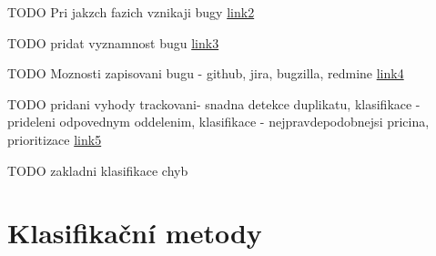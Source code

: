 \documentclass[czech,DP]{thesiskiv}
\begin{document}
 





TODO Pri jakzch fazich vznikaji bugy \href{https://en.wikipedia.org/wiki/Project_management}{link2} 

TODO  pridat vyznamnost bugu \href{https://www.getzephyr.com/insights/agile-strategies-managing-bug-fixes}{link3} 

TODO Moznosti zapisovani bugu - github, jira, bugzilla, redmine \href{https://en.wikipedia.org/wiki/Bug_tracking_system}{link4} 

TODO pridani vyhody trackovani- snadna detekce duplikatu, klasifikace - prideleni odpovednym oddelenim, klasifikace - nejpravdepodobnejsi pricina, prioritizace
\href{https://backlog.com/bug-tracking-guide/}{link5} 

TODO zakladni klasifikace chyb



\chapter{Klasifikační metody}








 
% 
%

{\raggedright\small

}
\end{document}
